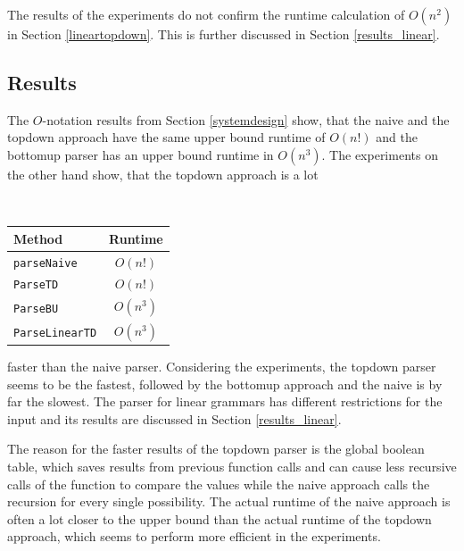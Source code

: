 \documentclass[a4paper, 11pt]{article}
\begin{document}
The results of the experiments do not confirm the runtime calculation of $O(n^2)$ in Section \ref{lineartopdown}. This is further discussed in Section \ref{results_linear}.



\subsection{Results}
\label{results}

\begin{minipage}{0.5\textwidth}
The $O$-notation results from Section \ref{systemdesign} show, that the naive and the topdown approach have the same upper bound runtime of $O(n!)$ and the bottomup parser has an upper bound runtime in $O(n^3)$.
The experiments on the other hand show, that the topdown approach is a lot 
\end{minipage}
\begin{minipage}{0.1\textwidth} \ \end{minipage}
\begin{minipage}{0.3\textwidth}
\begin{tabular}{|l|c|}
\hline
Method & Runtime \\
\hline
\texttt{parseNaive} & $O(n!)$\\
\texttt{ParseTD} & $O(n!)$ \\
\texttt{ParseBU} & $O(n^3)$\\
\texttt{ParseLinearTD} & $O(n^3)$\\
\hline
\end{tabular}
\end{minipage}


faster than the naive parser. Considering the experiments, the topdown parser seems to be the fastest, followed by the bottomup approach and the naive is by far the slowest.
The parser for linear grammars has different restrictions for the input and its results are discussed in Section \ref{results_linear}.

The reason for the faster results of the topdown parser is the global boolean table, which saves results from previous function calls and can cause less recursive calls of the function to compare the values while the naive approach calls the recursion for every single possibility. The actual runtime of the naive approach is often a lot closer to the upper bound than the actual runtime of the topdown approach, which seems to perform more efficient in the experiments.
\end{document}
